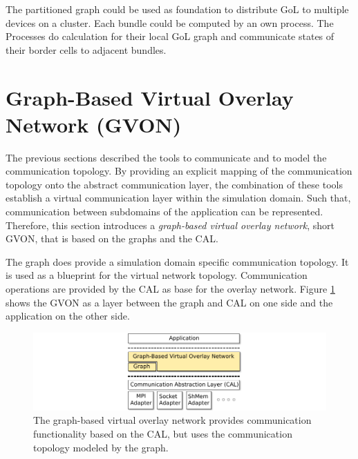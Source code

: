 The partitioned graph could be used as foundation to distribute GoL to
multiple devices on a cluster. Each bundle could be computed by an own
process. The Processes do calculation for their local GoL graph and
communicate states of their border cells to adjacent bundles.



\section{Graph-Based Virtual Overlay Network (GVON)}
\label{sec:gvon}
The previous sections described the tools to communicate and to
model the communication topology. By providing an explicit mapping of
the communication topology onto the abstract communication layer,
the combination of these tools establish a virtual communication layer
within the simulation domain.  Such that, communication between
subdomains of the application can be represented. Therefore, this
section introduces a \textit{graph-based virtual overlay network},
short GVON, that is based on the graphs and the CAL.

The graph does provide a simulation domain specific communication topology.  It is
used as a blueprint for the virtual network topology.  Communication
operations are provided by the CAL as base for the overlay network.
Figure \ref{fig:gvon} shows the GVON as a layer between the graph and
CAL on one side and the application on the other side.

\begin{figure}[H]
  \centering \includegraphics[width=\textwidth]{graphics/30_gvon}
  \caption{The graph-based virtual overlay network provides
    communication functionality based on the CAL, but uses the
    communication topology modeled by the graph.}
  \label{fig:gvon}
\end{figure}

